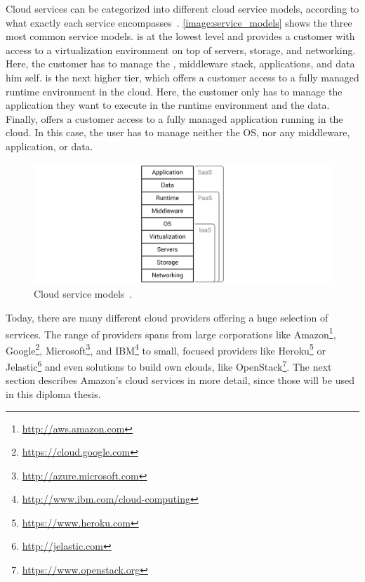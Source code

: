 Cloud services can be categorized into different cloud service models, according to what exactly each service encompasses~\autocite{cloudtaxonomy}.
\autoref{image:service_models} shows the three most common service models.
 is at the lowest level and provides a customer with access to a virtualization environment on top of servers, storage, and networking. Here, the customer has to manage the , middleware stack, applications, and data him self.
 is the next higher tier, which offers a customer access to a fully managed runtime environment in the cloud.
Here, the customer only has to manage the application they want to execute in the runtime environment and the data.
Finally,  offers a customer access to a fully managed application running in the cloud.
In this case, the user has to manage neither the OS, nor any middleware, application, or data.

\begin{figure}[!htbp]
	\centering
	\includegraphics[resolution=600]{fundamentals/assets/service_models}
	\caption{Cloud service models~\autocite[based on][]{cloud:def:gabler}.}
	\label{image:service_models}
\end{figure}

Today, there are many different cloud providers offering a huge selection of services.
The range of providers spans from large corporations like Amazon\footnote{\url{http://aws.amazon.com}\label{aws}}, Google\footnote{\url{https://cloud.google.com}}, Microsoft\footnote{\url{http://azure.microsoft.com}}, and IBM\footnote{\url{http://www.ibm.com/cloud-computing}} to small, focused providers like Heroku\footnote{\url{https://www.heroku.com}} or Jelastic\footnote{\url{http://jelastic.com}} and even solutions to build own clouds, like OpenStack\footnote{\url{https://www.openstack.org}}.
The next section describes Amazon's cloud services in more detail, since those will be used in this diploma thesis.

